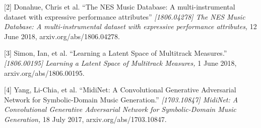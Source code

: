 \documentclass{article}
\begin{document}
[2] Donahue, Chris et al. ``The NES Music Database: A multi-instrumental dataset with expressive performance attributes'' {\it [1806.04278] The NES Music Database: A multi-instrumental dataset with expressive performance attributes,} 12 June 2018, arxiv.org/abs/1806.04278.

[3] Simon, Ian, et al. ``Learning a Latent Space of Multitrack Measures.'' {\it[1806.00195] Learning a Latent Space of Multitrack Measures,} 1 June 2018, arxiv.org/abs/1806.00195.

[4] Yang, Li-Chia, et al. ``MidiNet: A Convolutional Generative Adversarial Network for Symbolic-Domain Music Generation.'' {\it[1703.10847] MidiNet: A Convolutional Generative Adversarial Network for Symbolic-Domain Music Generation,} 18 July 2017, arxiv.org/abs/1703.10847.
\end{document}
